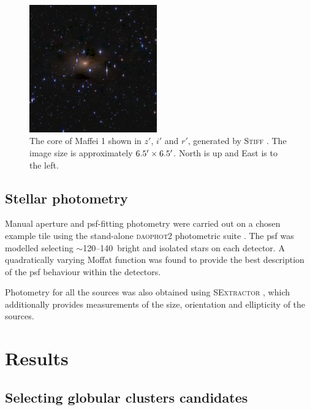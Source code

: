 \documentclass[useAMS,usenatbib]{mn2e}
\begin{document}
\begin{figure}
	\includegraphics[width=0.49\textwidth]{images/center.jpg}
	\caption{The core of Maffei 1 shown in $z'$, $i'$ and $r'$, generated by \textsc{Stiff} \citep{bertin2012}. The image size is approximately $6.5\hbox{$^\prime$}\times 6.5\hbox{$^\prime$}$. North is up and East is to the left.}
	\label{fig:maffei1colour}
\end{figure}


\subsection{Stellar photometry}
\label{sec:photometry}


Manual aperture and psf-fitting photometry were carried out on a chosen
example tile using the
stand-alone \textsc{daophot2} photometric suite \citep{stetson87}. The
psf was modelled selecting $\sim$120--140\, bright and isolated stars
on each detector. A quadratically varying Moffat function was found to
provide the best description of the psf behaviour within the
detectors.

Photometry for all the sources was also obtained using
\textsc{SExtractor} \citep{bertin96}, which additionally provides
measurements of the size, orientation and ellipticity of the sources.

\section{Results}
\label{sec:results}
\subsection{Selecting globular clusters candidates}
\label{sec:gc_candidates}
\end{document}
